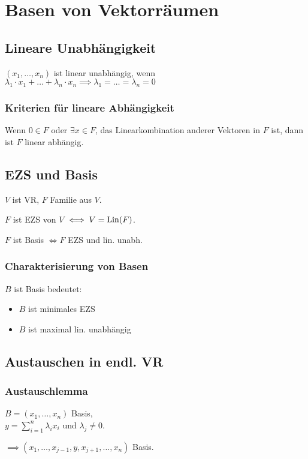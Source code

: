 \section*{Basen von Vektorräumen}

\subsection*{Lineare Unabhängigkeit}
$(x_1, \dots, x_n)$ ist linear unabhängig, wenn \\
$\lambda_1\cdot x_1 + \dots + \lambda_n \cdot x_n \implies \lambda_1 = \dots = \lambda_n = 0$

\subsubsection*{Kriterien für lineare Abhängigkeit}
Wenn $0\in F$ oder $\exists x\in F$, das Linearkombination anderer Vektoren in $F$ ist, dann ist $F$ linear abhängig.

\subsection*{EZS und Basis}
$V$ ist VR, $F$ Familie aus $V$.

$F$ ist EZS von $V$ $\iff V=\operatorname{Lin}(F)$.

$F$ ist Basis $\iff F$ EZS und lin. unabh. 

\subsubsection*{Charakterisierung von Basen}
$B$ ist Basis bedeutet:
\begin{itemize}
	\item $B$ ist minimales EZS
	\item $B$ ist maximal lin. unabhängig
\end{itemize}

\subsection*{Austauschen in endl. VR}
\subsubsection*{Austauschlemma}
$B=(x_1,\dots,x_n)$ Basis, \\
$\displaystyle y=\sum_{i=1}^n \lambda_i x_i$ und $\lambda_j \neq 0$.

$\implies (x_1,\dots,x_{j-1},y,x_{j+1},\dots,x_n)$ Basis.

